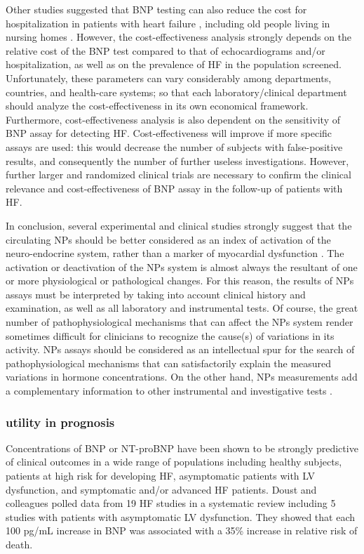 \documentclass[14pt,a4paper,onecolumn]{extarticle}
\begin{document}
Other studies suggested that BNP testing can also reduce the cost for hospitalization in patients with heart failure \citep{bib3263} \citep{bib3264}, including old people living in nursing homes \citep{bib3147}.  However, the cost-effectiveness analysis strongly depends on the relative cost of the BNP test compared to that of echocardiograms and/or hospitalization, as well as on the prevalence of HF in the population screened. Unfortunately, these parameters can vary considerably among departments, countries, and health-care systems; so that each laboratory/clinical department should analyze the cost-effectiveness in its own economical framework. Furthermore, cost-effectiveness analysis is also dependent on the sensitivity of BNP assay for detecting HF. Cost-effectiveness will improve if more specific assays are used: this would decrease the number of subjects with false-positive results, and consequently the number of further useless investigations. However, further larger and randomized clinical trials are necessary to confirm the clinical relevance and cost-effectiveness of BNP assay in the follow-up of patients with HF.

In conclusion, several  experimental and clinical studies strongly suggest that the circulating NPs should be better considered as an index of activation of the neuro-endocrine system, rather than a marker of myocardial dysfunction \citep{bib3298}. The activation or deactivation of the NPs system is almost always the resultant of one or more physiological or pathological changes. For this reason, the results of NPs assays must be interpreted by taking into account clinical history and examination, as well as all laboratory and instrumental tests. Of course, the great number of pathophysiological mechanisms that can affect the NPs system render sometimes difficult for clinicians to recognize the cause(s) of variations in its activity. NPs assays should be considered as an intellectual spur for the search of pathophysiological mechanisms that can satisfactorily explain the measured variations in hormone concentrations. On the other hand, NPs measurements add a complementary information to other instrumental and investigative tests \citep{bib3296}.

\clearpage
\subsubsection{utility in prognosis}

Concentrations of BNP or NT-proBNP have been shown to be strongly predictive of clinical outcomes in a wide range of populations including healthy subjects, patients at high risk for developing HF, asymptomatic patients with LV dysfunction, and symptomatic and/or advanced HF patients. Doust and colleagues polled data from 19 HF studies in a systematic review including 5 studies with patients with asymptomatic LV dysfunction. They showed that each 100 pg/mL increase in BNP was associated with a 35\% increase in relative risk of death. \citep{bib3186}
\end{document}
